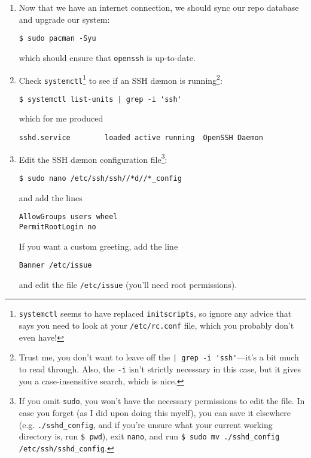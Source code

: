 \documentclass[12pt,letterpaper]{article}
\begin{document}
\begin{enumerate}
\item Now that we have an internet connection, we should sync our repo database and upgrade our system:
\begin{lstlisting}
$ sudo pacman -Syu
\end{lstlisting}
which should ensure that \lstinline{openssh} is up-to-date.

\item Check \lstinline{systemctl}\footnote{\lstinline{systemctl} seems to have replaced \lstinline{initscripts}, so ignore any advice that says you need to look at your \lstinline{/etc/rc.conf} file, which you probably don't even have!} to see if an SSH d\ae mon is running\footnote{Trust me, you don't want to leave off the \lstinline{| grep -i 'ssh'}---it's a bit much to read through.  Also, the \lstinline{-i} isn't strictly necessary in this case, but it gives you a case-insensitive search, which is nice.}:
\begin{lstlisting}
$ systemctl list-units | grep -i 'ssh'
\end{lstlisting}
which for me produced
\begin{lstlisting}[basicstyle=\ttfamily\footnotesize]
sshd.service        loaded active running  OpenSSH Daemon
\end{lstlisting}


\item Edit the SSH d\ae mon configuration file\footnote{If you omit \lstinline{sudo}, you won't have the necessary permissions to edit the file.  In case you forget (as I did upon doing this myelf), you can save it elsewhere (e.g. \lstinline{./sshd_config}, and if you're unsure what your current working directory is, run \lstinline{$ pwd}), exit \lstinline{nano}, and run \lstinline{$ sudo mv ./sshd_config /etc/ssh/sshd_config}.}:
\begin{lstlisting}
$ sudo nano /etc/ssh/ssh//*d//*_config
\end{lstlisting}
and add the lines
\begin{lstlisting}
AllowGroups users wheel
PermitRootLogin no
\end{lstlisting}
If you want a custom greeting, add the line
\begin{lstlisting}
Banner /etc/issue
\end{lstlisting}
and edit the file \lstinline{/etc/issue} (you'll need root permissions).


\end{enumerate}
\end{document}
